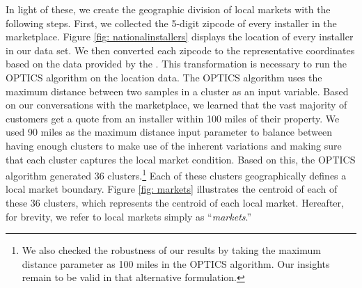 \documentclass[msom,blindrev]{informs3}
\begin{document}
In light of these, we create the geographic division of local markets with the following steps. First, we collected the 5-digit zipcode of
every installer in the marketplace. Figure \ref{fig: nationalinstallers} displays the location of every installer in our data set. We then converted each zipcode  to the representative coordinates based on the data provided by the \citet{us_census_bureau_2019}. This transformation is necessary to run the OPTICS algorithm on the location data. The OPTICS algorithm uses the maximum distance between two samples in a cluster as an input variable. Based on our conversations with the marketplace, we learned that the vast majority of customers get a quote from an installer within 100 miles of their property. We used 90 miles as the maximum distance input parameter to balance between having enough clusters to make use of the inherent variations and making sure that each cluster captures the local market condition. Based on this, the OPTICS algorithm generated 36 clusters.\footnote{We also checked the robustness of our results by taking the maximum distance parameter as 100 miles in the OPTICS algorithm. Our insights remain to be valid in that alternative formulation.} Each of these clusters geographically defines a local market boundary. Figure \ref{fig: markets} illustrates the centroid of each of these 36 clusters, which represents the centroid of each local market. Hereafter, for brevity, we refer to local markets simply as ``\emph{markets}.''



\end{document}
